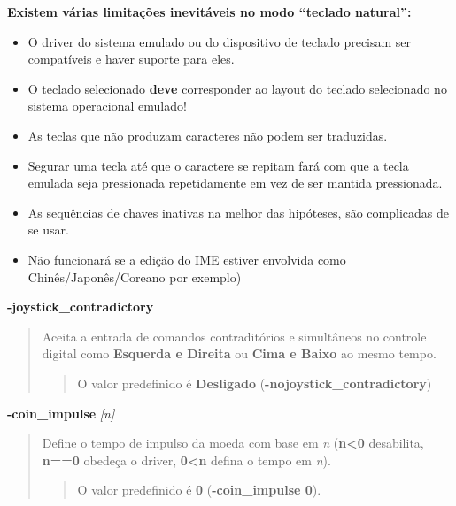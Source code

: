\documentclass[letterpaper,10pt,brazil]{sphinxmanual}
\begin{document}
\textbf{Existem várias limitações inevitáveis no modo ``teclado natural'':}
\begin{itemize}
\item {} 
O driver do sistema emulado ou do dispositivo de teclado precisam
ser compatíveis e haver suporte para eles.

\item {} 
O teclado selecionado \textbf{deve} corresponder ao layout do teclado
selecionado no sistema operacional emulado!

\item {} 
As teclas que não produzam caracteres não podem ser traduzidas.

\item {} 
Segurar uma tecla até que o caractere se repitam fará com que a
tecla emulada seja pressionada repetidamente em vez de ser mantida
pressionada.

\item {} 
As sequências de chaves inativas na melhor das hipóteses, são
complicadas de se usar.

\item {} 
Não funcionará se a edição do IME estiver envolvida como
Chinês/Japonês/Coreano por exemplo)

\end{itemize}
\label{commandline/commandline-all:mame-commandline-joystickcontradictory}
\textbf{-joystick\_contradictory}
\begin{quote}

Aceita a entrada de comandos contraditórios e simultâneos no
controle digital como \textbf{Esquerda e Direita} ou \textbf{Cima e Baixo} ao
mesmo tempo.
\begin{quote}

O valor predefinido é \textbf{Desligado}
(\textbf{-nojoystick\_contradictory})
\end{quote}
\end{quote}
\label{commandline/commandline-all:mame-commandline-coinimpulse}
\textbf{-coin\_impulse} \emph{{[}n{]}}
\begin{quote}

Define o tempo de impulso da moeda com base em \emph{n} (\textbf{n\textless{}0}
desabilita, \textbf{n==0} obedeça o driver, \textbf{0\textless{}n} defina o tempo em
\emph{n}).
\begin{quote}

O valor predefinido é \textbf{0} (\textbf{-coin\_impulse 0}).
\end{quote}
\end{quote}
\end{document}
